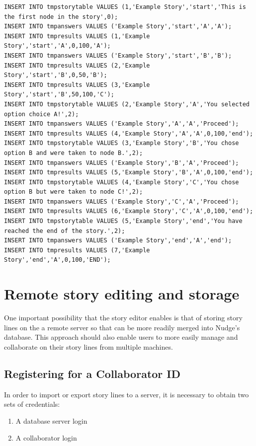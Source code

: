 \documentclass[12pt,letterpaper]{article}
\begin{document}
\begin{lstlisting}[breaklines=true, caption=Set of generated SQL statements.]
INSERT INTO tmpstorytable VALUES (1,'Example Story','start','This is the first node in the story',0);
INSERT INTO tmpanswers VALUES ('Example Story','start','A','A');
INSERT INTO tmpresults VALUES (1,'Example Story','start','A',0,100,'A');
INSERT INTO tmpanswers VALUES ('Example Story','start','B','B');
INSERT INTO tmpresults VALUES (2,'Example Story','start','B',0,50,'B');
INSERT INTO tmpresults VALUES (3,'Example Story','start','B',50,100,'C');
INSERT INTO tmpstorytable VALUES (2,'Example Story','A','You selected option choice A!',2);
INSERT INTO tmpanswers VALUES ('Example Story','A','A','Proceed');
INSERT INTO tmpresults VALUES (4,'Example Story','A','A',0,100,'end');
INSERT INTO tmpstorytable VALUES (3,'Example Story','B','You chose option B and were taken to node B.',2);
INSERT INTO tmpanswers VALUES ('Example Story','B','A','Proceed');
INSERT INTO tmpresults VALUES (5,'Example Story','B','A',0,100,'end');
INSERT INTO tmpstorytable VALUES (4,'Example Story','C','You chose option B but were taken to node C!',2);
INSERT INTO tmpanswers VALUES ('Example Story','C','A','Proceed');
INSERT INTO tmpresults VALUES (6,'Example Story','C','A',0,100,'end');
INSERT INTO tmpstorytable VALUES (5,'Example Story','end','You have reached the end of the story.',2);
INSERT INTO tmpanswers VALUES ('Example Story','end','A','end');
INSERT INTO tmpresults VALUES (7,'Example Story','end','A',0,100,'END');
\end{lstlisting}

\section{Remote story editing and storage}

One important possibility that the story editor enables is that of storing story lines on 
the a remote server so that can be more readily merged into Nudge's database. This approach
should also enable users to more easily manage and collaborate on their story lines from multiple
machines.

\subsection{Registering for a Collaborator ID}
In order to import or export story lines to a server, it is necessary to obtain two sets of credentials:
    
\begin{enumerate}
\item A database server login
\item A collaborator login
\end{enumerate}
\end{document}
